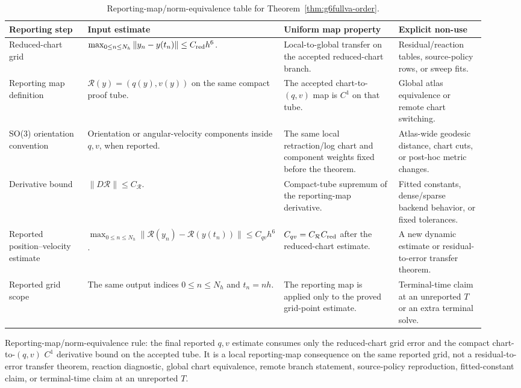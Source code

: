 \documentclass[preprint,12pt]{elsarticle}
\begin{document}
\begin{table}[htbp]
\centering
\caption{Reporting-map/norm-equivalence table for
Theorem~\ref{thm:g6fullva-order}.}
\label{tab:reporting-map-norm-equivalence-ledger}
\scriptsize
\setlength{\tabcolsep}{2pt}
\renewcommand{\arraystretch}{0.9}
\begin{tabular}{P{0.18\linewidth}P{0.28\linewidth}P{0.27\linewidth}P{0.19\linewidth}}
\toprule
Reporting step & Input estimate & Uniform map property & Explicit non-use \\
\midrule
Reduced-chart grid &
\(\max_{0\le n\le N_h}\|y_n-y(t_n)\|\le C_{\rm red}h^6\). &
Local-to-global transfer on the accepted reduced-chart branch. &
Residual/reaction tables, source-policy rows, or sweep fits. \\
Reporting map definition &
\(\mathcal R(y)=(q(y),v(y))\) on the same compact proof tube. &
The accepted chart-to-\((q,v)\) map is \(C^1\) on that tube. &
Global atlas equivalence or remote chart switching. \\
SO(3) orientation convention &
Orientation or angular-velocity components inside \(q,v\), when reported. &
The same local retraction/log chart and component weights fixed before the theorem. &
Atlas-wide geodesic distance, chart cuts, or post-hoc metric changes. \\
Derivative bound &
\(\|D\mathcal R\|\le C_{\mathcal R}\). &
Compact-tube supremum of the reporting-map derivative. &
Fitted constants, dense/sparse backend behavior, or fixed tolerances. \\
Reported position--velocity estimate &
\(\max_{0\le n\le N_h}\|\mathcal R(y_n)-\mathcal R(y(t_n))\|
\le C_{qv}h^6\). &
\(C_{qv}=C_{\mathcal R}C_{\rm red}\) after the reduced-chart estimate. &
A new dynamic estimate or residual-to-error transfer theorem. \\
Reported grid scope &
The same output indices \(0\le n\le N_h\) and \(t_n=nh\). &
The reporting map is applied only to the proved grid-point estimate. &
Terminal-time claim at an unreported \(T\) or an extra terminal solve. \\
\bottomrule
\end{tabular}
\end{table}

Reporting-map/norm-equivalence rule: the final
reported \(q,v\) estimate consumes only the reduced-chart grid error and the
compact chart-to-\((q,v)\) \(C^1\) derivative bound on the accepted tube. It
is a local reporting-map consequence on the same reported grid, not a
residual-to-error transfer theorem, reaction diagnostic, global chart equivalence,
remote branch statement, source-policy reproduction, fitted-constant claim,
or terminal-time claim at an unreported \(T\).
\end{document}
